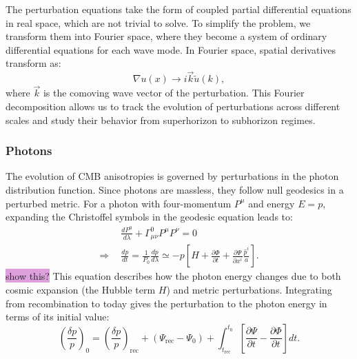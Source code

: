 \documentclass{aa}
\numberwithin{equation}{section}
\numberwithin{table}{section}
\numberwithin{figure}{section}
\begin{document}
The perturbation equations take the form of coupled partial differential equations in real space, which are not trivial to solve. To simplify the problem, we transform them into Fourier space, where they become a system of ordinary differential equations for each wave mode. 
In Fourier space, spatial derivatives transform as:  
\begin{equation}
\nabla u(x) \rightarrow i \vec{k} \tilde{u}(k),
\end{equation}
where $\vec{k}$ is the comoving wave vector of the perturbation. This Fourier decomposition allows us to track the evolution of perturbations across different scales and study their behavior from superhorizon to subhorizon regimes. 


\subsubsection{Photons}
The evolution of CMB anisotropies is governed by perturbations in the photon distribution function. Since photons are massless, they follow null geodesics in a perturbed metric. For a photon with four-momentum $P^\mu$ and energy $E=p$, expanding the Christoffel symbols in the geodesic equation leads to: 
\begin{align}
&\frac{dP^0}{d\lambda} + \Gamma^0_{\mu\nu} P^\mu P^\nu = 0 \\
\Rightarrow\hspace{5pt} &\frac{dp}{dt} = \frac{1}{P_0}\frac{dp}{d\lambda} \simeq -p\left[H + \frac{\partial \Phi}{\partial t} + \frac{\partial \Psi}{\partial x^{i}}\frac{\hat{p}^{i}}{a}\right].
\end{align}
\colorbox{Plum}{show this?} This equation describes how the photon energy changes due to both cosmic expansion (the Hubble term $H$) and metric perturbations. Integrating from recombination to today gives the perturbation to the photon energy in terms of its initial value: 
\begin{equation}
\left(\frac{\delta p}{p}\right)_0 = \left(\frac{\delta p}{p}\right)_{\text{rec}} + \left(\Psi_{\text{rec}} - \Psi_0\right) + \int_{t_{\text{rec}}}^{t_0} \left[\frac{\partial\Psi}{\partial t} - \frac{\partial \Phi}{\partial t} \right] dt. \label{eq: photon momentum}
\end{equation}
\end{document}
